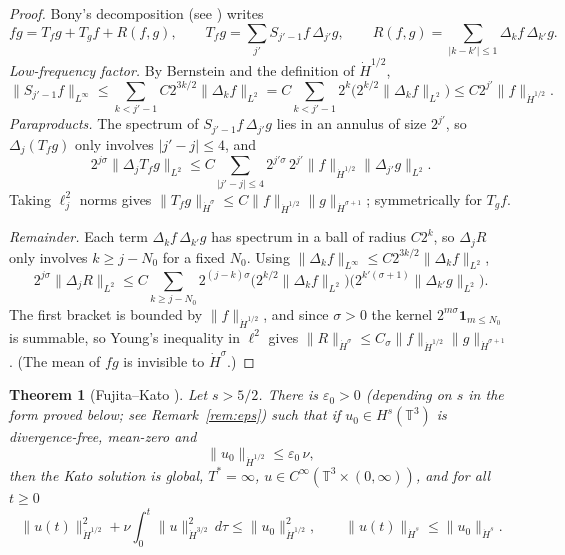 \documentclass[11pt,reqno]{amsart}
\newtheorem{theorem}{Theorem}
\theoremstyle{definition}
\theoremstyle{remark}
\newcommand{\T}{\mathbb{T}^3}
\newcommand{\dH}[1]{\dot H^{#1}}
\newcommand{\norm}[1]{\lVert #1\rVert}
\newcommand{\abs}[1]{\lvert #1\rvert}
\begin{document}
\begin{proof}
Bony's decomposition \cite{Bony1981} (see \cite[Ch.~2]{BCD2011}) writes
\[
fg=T_fg+T_gf+R(f,g),\qquad T_fg=\sum_{j'}S_{j'-1}f\,\Delta_{j'}g,\qquad R(f,g)=\sum_{\abs{k-k'}\le1}\Delta_kf\,\Delta_{k'}g .
\]
\emph{Low-frequency factor.} By Bernstein and the definition of $\dH{1/2}$,
\[
\norm{S_{j'-1}f}_{L^\infty}\le\sum_{k<j'-1}C2^{3k/2}\norm{\Delta_kf}_{L^2}=C\sum_{k<j'-1}2^k\bigl(2^{k/2}\norm{\Delta_kf}_{L^2}\bigr)\le C2^{j'}\norm{f}_{\dH{1/2}} .
\]
\emph{Paraproducts.} The spectrum of $S_{j'-1}f\,\Delta_{j'}g$ lies in an annulus of size $2^{j'}$, so $\Delta_j(T_fg)$ only involves $\abs{j'-j}\le4$, and
\[
2^{j\sigma}\norm{\Delta_jT_fg}_{L^2}\le C\sum_{\abs{j'-j}\le4}2^{j'\sigma}\,2^{j'}\norm{f}_{\dH{1/2}}\norm{\Delta_{j'}g}_{L^2}.
\]
Taking $\ell^2_j$ norms gives $\norm{T_fg}_{\dH{\sigma}}\le C\norm{f}_{\dH{1/2}}\norm{g}_{\dH{\sigma+1}}$; symmetrically for $T_gf$.

\emph{Remainder.} Each term $\Delta_kf\,\Delta_{k'}g$ has spectrum in a ball of radius $C2^k$, so $\Delta_jR$ only involves $k\ge j-N_0$ for a fixed $N_0$. Using $\norm{\Delta_kf}_{L^\infty}\le C2^{3k/2}\norm{\Delta_kf}_{L^2}$,
\[
2^{j\sigma}\norm{\Delta_jR}_{L^2}\le C\sum_{k\ge j-N_0}2^{(j-k)\sigma}\bigl(2^{k/2}\norm{\Delta_kf}_{L^2}\bigr)\bigl(2^{k'(\sigma+1)}\norm{\Delta_{k'}g}_{L^2}\bigr).
\]
The first bracket is bounded by $\norm{f}_{\dH{1/2}}$, and since $\sigma>0$ the kernel $2^{m\sigma}\mathbf 1_{m\le N_0}$ is summable, so Young's inequality in $\ell^2$ gives $\norm{R}_{\dH{\sigma}}\le C_\sigma\norm{f}_{\dH{1/2}}\norm{g}_{\dH{\sigma+1}}$. (The mean of $fg$ is invisible to $\dH{\sigma}$.)
\end{proof}

\begin{theorem}[Fujita--Kato {\cite{FujitaKato1964}}]\label{thm:C}
Let $s>5/2$. There is $\varepsilon_0>0$ (depending on $s$ in the form proved below; see Remark~\ref{rem:eps}) such that if $u_0\in H^s(\T)$ is divergence-free, mean-zero and
\[
\norm{u_0}_{\dH{1/2}}\le\varepsilon_0\,\nu,
\]
then the Kato solution is global, $T^*=\infty$, $u\in C^\infty(\T\times(0,\infty))$, and for all $t\ge0$
\[
\norm{u(t)}_{\dH{1/2}}^2+\nu\int_0^t\norm{u}_{\dH{3/2}}^2\,d\tau\le\norm{u_0}_{\dH{1/2}}^2,\qquad \norm{u(t)}_{\dH{s}}\le\norm{u_0}_{\dH{s}} .
\]
\end{theorem}
\end{document}
